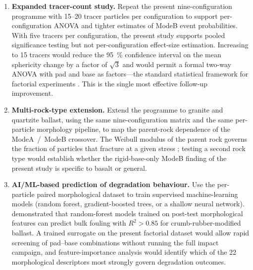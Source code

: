 \begin{enumerate}[label=(\arabic*),leftmargin=*,itemsep=6pt]
    \item \textbf{Expanded tracer-count study.} Repeat the present
          nine-configuration programme with \numrange{15}{20} tracer
          particles per configuration to support per-configuration
          ANOVA and tighter estimates of \gls{ModeB} event probabilities.
          With five tracers per configuration, the present study supports
          pooled significance testing but not per-configuration effect-size
          estimation. Increasing to 15 tracers would reduce the
          \SI{95}{\percent} confidence interval on the mean sphericity
          change by a factor of $\sqrt{3}$ and would permit a formal
          two-way ANOVA with pad and base as factors---the standard
          statistical framework for factorial experiments
          \citep{Montgomery2013}. This is the single most effective
          follow-up improvement.

    \item \textbf{Multi-rock-type extension.} Extend the programme to
          granite and quartzite ballast, using the same nine-configuration
          matrix and the same per-particle morphology pipeline, to map
          the parent-rock dependence of the \gls{ModeA}~/~\gls{ModeB}
          crossover. The Weibull modulus of the parent rock governs the
          fraction of particles that fracture at a given stress
          \citep{McDowell2002}; testing a second rock type would
          establish whether the rigid-base-only \gls{ModeB} finding
          of the present study is specific to basalt or general.

    \item \textbf{AI/ML-based prediction of degradation behaviour.} Use
          the per-particle paired morphological dataset to train
          supervised machine-learning models (random forest,
          gradient-boosted trees, or a shallow neural network).
          \citet{Koohmishi2023} demonstrated that random-forest models
          trained on post-test morphological features can predict bulk
          fouling with $R^{2} > 0.85$ for crumb-rubber-modified ballast.
          A trained surrogate on the present factorial dataset would
          allow rapid screening of pad--base combinations without
          running the full impact campaign, and feature-importance
          analysis would identify which of the 22 morphological
          descriptors most strongly govern degradation outcomes.


\end{enumerate}
